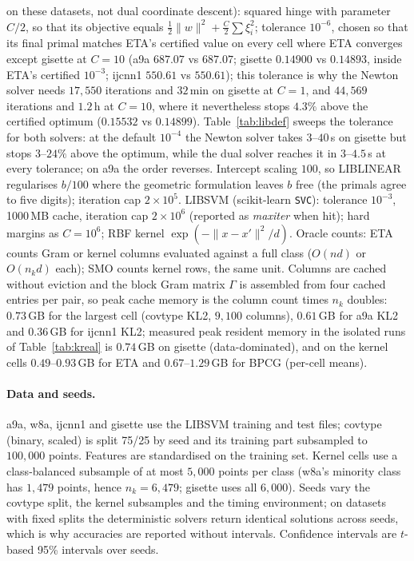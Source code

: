 \documentclass{opt2026}   %
\newcommand{\norm}[1]{\lVert #1 \rVert}
\begin{document}
on these datasets, not dual coordinate descent): squared hinge with parameter
$C/2$, so that its objective equals $\tfrac12\norm w^2+\tfrac C2\sum\xi_i^2$;
tolerance $10^{-6}$, chosen so that its final primal matches ETA's
certified value on every cell where ETA converges except gisette at
$C{=}10$ (a9a $687.07$ vs $687.07$; gisette $0.14900$ vs $0.14893$,
inside ETA's certified $10^{-3}$; ijcnn1 $550.61$ vs $550.61$); this
tolerance is why the Newton solver needs $17{,}550$ iterations and
$32$\,min on gisette at $C{=}1$, and $44{,}569$ iterations and $1.2$\,h
at $C{=}10$, where it nevertheless stops $4.3\%$ above the certified optimum ($0.15532$ vs $0.14899$). Table~\ref{tab:libdef} sweeps the
tolerance for both solvers: at the default $10^{-4}$ the Newton solver
takes $3$--$40$\,s on gisette but stops $3$--$24\%$ above the optimum,
while the dual solver reaches it in $3$--$4.5$\,s at every tolerance; on
a9a the order reverses.
Intercept scaling $100$, so LIBLINEAR regularises $b/100$ where the
geometric formulation leaves $b$ free (the primals agree to five
digits); iteration cap
$2\times10^5$. LIBSVM \cite{chang2011} (scikit-learn \texttt{SVC}): tolerance $10^{-3}$, 1000\,MB cache,
iteration cap $2\times10^6$ (reported as \emph{maxiter} when hit); hard
margins as $C=10^6$; RBF kernel $\exp(-\norm{x-x'}^2/d)$. Oracle counts: ETA counts
Gram or kernel columns evaluated against a full class ($O(nd)$ or
$O(n_kd)$ each); SMO counts kernel rows, the same unit. Columns are
cached without eviction and the block Gram matrix $\Gamma$ is
assembled from four cached entries per pair, so peak cache memory is
the column count times $n_k$ doubles: $0.73$\,GB for the largest cell
(covtype KL2, $9{,}100$ columns), $0.61$\,GB for a9a KL2 and
$0.36$\,GB for ijcnn1 KL2; measured peak resident memory in the
isolated runs of Table~\ref{tab:kreal} is $0.74$\,GB on gisette
(data-dominated), and on the kernel cells $0.49$--$0.93$\,GB for ETA and
$0.67$--$1.29$\,GB for BPCG (per-cell means).

\paragraph{Data and seeds.} a9a, w8a, ijcnn1 and gisette use the LIBSVM
training and test files; covtype (binary, scaled) is split 75/25 by
seed and its training part subsampled to $100{,}000$ points. Features are standardised
on the training set. Kernel cells use a class-balanced subsample of at
most $5{,}000$ points per class (w8a's minority class has $1{,}479$
points, hence $n_k=6{,}479$; gisette uses all $6{,}000$). Seeds vary
the covtype split, the kernel subsamples and the timing environment; on
datasets with fixed splits the deterministic solvers return identical
solutions across seeds, which is why accuracies are reported without
intervals.
Confidence intervals are $t$-based 95\% intervals over seeds.
\end{document}
